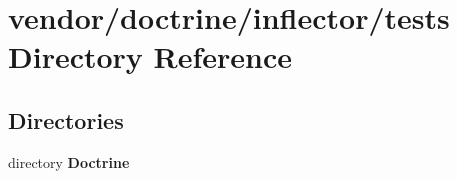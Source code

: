 \section{vendor/doctrine/inflector/tests Directory Reference}
\label{dir_470f7366596b2fc2fd4453e9be99f124}
\subsection*{Directories}
\begin{DoxyCompactItemize}
\item 
directory {\bf Doctrine}
\end{DoxyCompactItemize}
